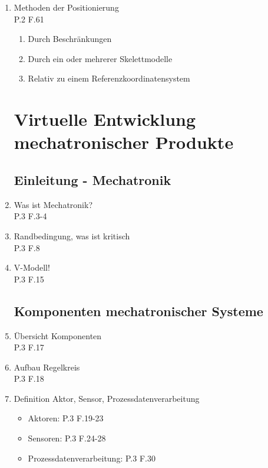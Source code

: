\documentclass[10pt,a4paper,fleqn]{article}
\begin{document}
\begin{enumerate}
	\item Methoden der Positionierung\\
		P.2 F.61
		\begin{enumerate}
			\item Durch Beschränkungen
			\item Durch ein oder mehrerer Skelettmodelle
			\item Relativ zu einem Referenzkoordinatensystem
		\end{enumerate}
\section{Virtuelle Entwicklung mechatronischer Produkte}
\subsection{Einleitung - Mechatronik}
	\item Was ist Mechatronik?\\
		P.3 F.3-4
	\item Randbedingung, was ist kritisch\\
		P.3 F.8
	\item V-Modell!\\
		P.3 F.15
\subsection{Komponenten mechatronischer Systeme}
	\item Übersicht Komponenten\\
		P.3 F.17
	\item Aufbau Regelkreis\\
		P.3 F.18
	\item Definition Aktor, Sensor, Prozessdatenverarbeitung
		\begin{itemize}
		 	\item Aktoren: P.3 F.19-23
		 	\item Sensoren: P.3 F.24-28
		 	\item Prozessdatenverarbeitung: P.3 F.30
		 \end{itemize}

\end{enumerate}
\end{document}

